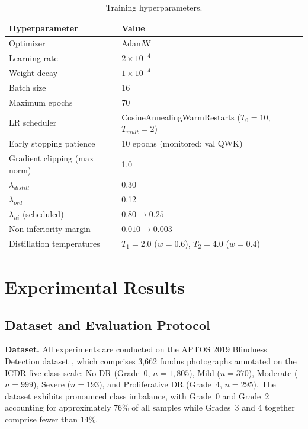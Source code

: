 \documentclass[a4paper,fleqn]{cas-dc}
\begin{document}
\begin{table}[t]
\centering
\caption{Training hyperparameters.}
\label{tab:hyperparams}
\small
\begin{tabular}{ll}
\toprule
Hyperparameter & Value \\
\midrule
Optimizer & AdamW \\
Learning rate & $2 \times 10^{-4}$ \\
Weight decay & $1 \times 10^{-4}$ \\
Batch size & 16 \\
Maximum epochs & 70 \\
LR scheduler & CosineAnnealingWarmRestarts ($T_0{=}10$, $T_{mult}{=}2$) \\
Early stopping patience & 10 epochs (monitored: val QWK) \\
Gradient clipping (max norm) & 1.0 \\
$\lambda_{distill}$ & 0.30 \\
$\lambda_{ord}$ & 0.12 \\
$\lambda_{ni}$ (scheduled) & $0.80 \to 0.25$ \\
Non-inferiority margin & $0.010 \to 0.003$ \\
Distillation temperatures & $T_1{=}2.0$ ($w{=}0.6$), $T_2{=}4.0$ ($w{=}0.4$) \\
\bottomrule
\end{tabular}
\end{table}

\section{Experimental Results}

\subsection{Dataset and Evaluation Protocol}

\textbf{Dataset.} All experiments are conducted on the APTOS 2019 Blindness Detection dataset \cite{aptos2019}, which comprises 3,662 fundus photographs annotated on the ICDR five-class scale: No DR (Grade~0, $n{=}1{,}805$), Mild ($n{=}370$), Moderate ($n{=}999$), Severe ($n{=}193$), and Proliferative DR (Grade~4, $n{=}295$). The dataset exhibits pronounced class imbalance, with Grade~0 and Grade~2 accounting for approximately 76\% of all samples while Grades~3 and 4 together comprise fewer than 14\%.
\end{document}
